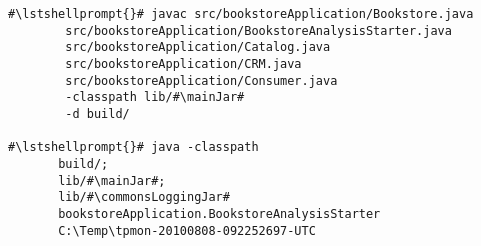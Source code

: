 \begin{lstlisting}[caption=Compile and run under Windows,label=lst:bookstoreAnalysisStarterWin] 			
#\lstshellprompt{}# javac src/bookstoreApplication/Bookstore.java 
        src/bookstoreApplication/BookstoreAnalysisStarter.java 
        src/bookstoreApplication/Catalog.java 
        src/bookstoreApplication/CRM.java 
        src/bookstoreApplication/Consumer.java
        -classpath lib/#\mainJar#
        -d build/

#\lstshellprompt{}# java -classpath 
       build/;
       lib/#\mainJar#;
       lib/#\commonsLoggingJar#
       bookstoreApplication.BookstoreAnalysisStarter 
       C:\Temp\tpmon-20100808-092252697-UTC
\end{lstlisting}	
